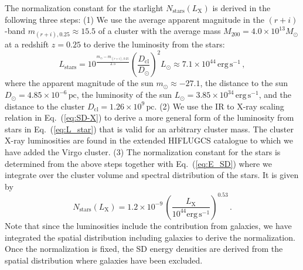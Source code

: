 \documentclass[10pt,aps,pra,reprint,amsmath,amsfonts,amssymb,showpacs]{revtex4-1}
\newcommand{\rmn}{\mathrm}
\newcommand{\clu}{\rmn{cl}}
\newcommand{\msun}{M_\odot}
\newcommand{\stars}{\rmn{stars}}
\newcommand{\lx}{L_\rmn{X}}
\newcommand{\mvir}{M_{200}}
\begin{document}
The normalization constant for the starlight $N_\stars(\lx)$ is derived
in the following three steps: (1) We use the average apparent magnitude
in the $(r+i)$-band $m_{(r+i),0.25}\approx 15.5$
\cite{2005MNRAS.358..949Z} of a cluster with the average mass
$\mvir=4.0\times10^{13}\msun$ at a redshift $z=0.25$ to derive the
luminosity from the stars:
\begin{equation}
L_\stars=10^{\frac{m_\odot-m_{(r+i),0.25}}{2.5}}
\left(\frac{D_\clu}{D_\odot}\right)^2 L_\odot
\approx 7.1\times10^{44}\,\rmn{erg}\,\rmn{s}^{-1}\,,
\label{eq:L_star}
\end{equation}
where the apparent magnitude of the sun $m_\odot\approx -27.1$, the
distance to the sun $D_\odot=4.85\times10^{-6}\,\rmn{pc}$, the
luminosity of the sun $L_\odot=3.85\times10^{34}\,\rmn{erg\,s}^{-1}$,
and the distance to the cluster $D_\clu=1.26\times10^9\,\rmn{pc}$. (2)
We use the IR to X-ray scaling relation in Eq.~(\ref{eq:SD-X}) to derive
a more general form of the luminosity from stars in
Eq.~(\ref{eq:L_star}) that is valid for an arbitrary cluster mass. The
cluster X-ray luminosities are found in the extended HIFLUGCS
catalogue \cite{2002ApJ...567..716R} to which we have added the Virgo
cluster. (3) The normalization constant for the stars is
determined from the above steps together with Eq.~(\ref{eq:E_SD})
where we integrate over the cluster volume and spectral distribution
of the stars. It is given by
\begin{equation}
 N_\stars(\lx) = 1.2\times10^{-9}\,
\left(\frac{\lx}{10^{44}\rmn{erg\,s}^{-1}}\right)^{0.53}\,.
\label{eq:N_stars}
\end{equation}
Note that since the luminosities include the contribution from
galaxies, we have integrated the spatial distribution including
galaxies to derive the normalization. Once the normalization is fixed,
the SD energy densities are derived from the spatial distribution
where galaxies have been excluded.
\end{document}
